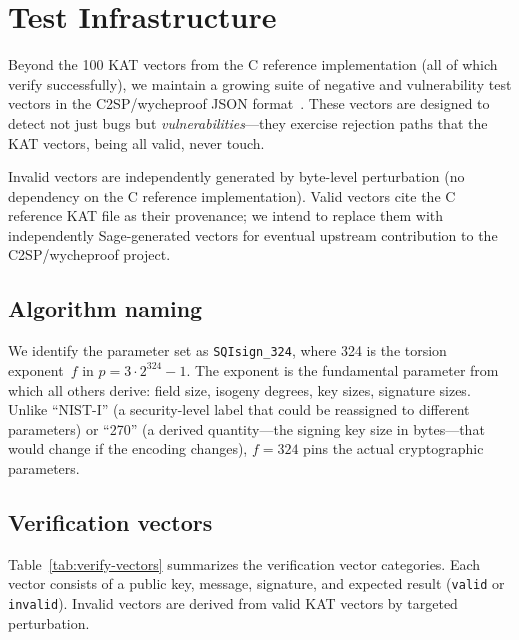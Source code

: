\section{Test Infrastructure}
\label{sec:testing}

Beyond the 100 KAT vectors from the C reference implementation (all of
which verify successfully), we maintain a growing suite of negative and
vulnerability test vectors in the C2SP/wycheproof JSON
format~\cite{wycheproof}.  These vectors are designed to detect not
just bugs but \emph{vulnerabilities}---they exercise rejection paths
that the KAT vectors, being all valid, never touch.

Invalid vectors are independently generated by byte-level perturbation
(no dependency on the C reference implementation).  Valid vectors cite
the C reference KAT file as their provenance; we intend to replace
them with independently Sage-generated vectors for eventual upstream
contribution to the C2SP/wycheproof project.

\subsection{Algorithm naming}

We identify the parameter set as \texttt{SQIsign\_324}, where 324 is
the torsion exponent~$f$ in $p = 3 \cdot 2^{324} - 1$.  The exponent
is the fundamental parameter from which all others derive: field size,
isogeny degrees, key sizes, signature sizes.  Unlike ``NIST-I'' (a
security-level label that could be reassigned to different parameters)
or ``270'' (a derived quantity---the signing key size in bytes---that
would change if the encoding changes), $f = 324$ pins the actual
cryptographic parameters.

\subsection{Verification vectors}

Table~\ref{tab:verify-vectors} summarizes the verification vector
categories.  Each vector consists of a public key, message, signature,
and expected result (\texttt{valid} or \texttt{invalid}).  Invalid
vectors are derived from valid KAT vectors by targeted perturbation.

